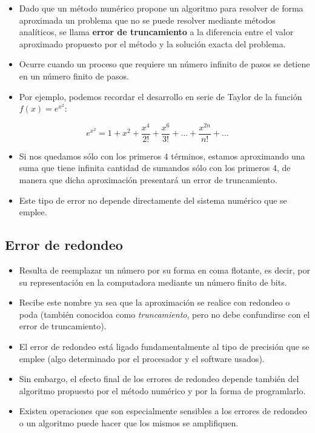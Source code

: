\documentclass[]{book}
\providecommand{\tightlist}{%
  \setlength{\itemsep}{0pt}\setlength{\parskip}{0pt}}
\begin{document}
\begin{itemize}
\tightlist
\item
  Dado que un método numérico propone un algoritmo para resolver de forma aproximada un problema que no se puede resolver mediante métodos analíticos, se llama \textbf{error de truncamiento} a la diferencia entre el valor aproximado propuesto por el método y la solución exacta del problema.
\item
  Ocurre cuando un proceso que requiere un número infinito de pasos se detiene en un número finito de pasos.
\item
  Por ejemplo, podemos recordar el desarrollo en serie de Taylor de la función \(f(x) = e^{x^2}\):
\end{itemize}

\[ e^{x^2} = 1 + x^2 + \frac{x^4}{2!} + \frac{x^6}{3!} + ... + \frac{x^{2n}}{n!} + ...\]

\begin{itemize}
\tightlist
\item
  Si nos quedamos sólo con los primeros 4 términos, estamos aproximando una suma que tiene infinita cantidad de sumandos sólo con los primeros 4, de manera que dicha aproximación presentará un error de truncamiento.
\item
  Este tipo de error no depende directamente del sistema numérico que se emplee.
\end{itemize}

\hypertarget{error-de-redondeo}{%
\subsection{Error de redondeo}\label{error-de-redondeo}}

\begin{itemize}
\tightlist
\item
  Resulta de reemplazar un número por su forma en coma flotante, es decir, por su representación en la computadora mediante un número finito de bits.
\item
  Recibe este nombre ya sea que la aproximación se realice con redondeo o poda (también conocidoa como \emph{truncamiento}, pero no debe confundirse con el error de truncamiento).
\item
  El error de redondeo está ligado fundamentalmente al tipo de precisión que se emplee (algo determinado por el procesador y el software usados).
\item
  Sin embargo, el efecto final de los errores de redondeo depende también del algoritmo propuesto por el método numérico y por la forma de programlarlo.
\item
  Existen operaciones que son especialmente sensibles a los errores de redondeo o un algoritmo puede hacer que los mismos se amplifiquen.
\end{itemize}
\end{document}
